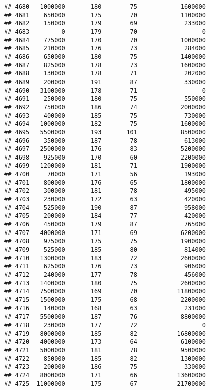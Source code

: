\documentclass[
]{article}
\begin{document}
\begin{verbatim}
## 4680   1000000       180        75            1600000
## 4681    650000       175        70            1100000
## 4682    150000       179        69             233000
## 4683         0       179        70                  0
## 4684    775000       170        70            1000000
## 4685    210000       176        73             284000
## 4686    650000       180        75            1400000
## 4687    825000       178        73            1600000
## 4688    130000       178        71             202000
## 4689    200000       191        87             330000
## 4690   3100000       178        71                  0
## 4691    250000       180        75             550000
## 4692    750000       186        74            2000000
## 4693    400000       185        75             730000
## 4694   1000000       182        75            1600000
## 4695   5500000       193       101            8500000
## 4696    350000       187        78             613000
## 4697   2500000       176        83            5200000
## 4698    925000       170        60            2200000
## 4699   1200000       181        71            1900000
## 4700     70000       171        56             193000
## 4701    800000       176        65            1800000
## 4702    300000       181        78             495000
## 4703    230000       172        63             420000
## 4704    525000       190        87             958000
## 4705    200000       184        77             420000
## 4706    450000       179        87             765000
## 4707   4000000       171        69            6200000
## 4708    975000       175        75            1900000
## 4709    525000       185        80             814000
## 4710   1300000       183        72            2600000
## 4711    625000       176        73             906000
## 4712    240000       177        78             456000
## 4713   1400000       180        75            2600000
## 4714   7500000       169        70           11800000
## 4715   1500000       175        68            2200000
## 4716    140000       168        63             231000
## 4717   5500000       187        76            8800000
## 4718    230000       177        72                  0
## 4719   8000000       185        82           16800000
## 4720   4000000       173        64            6100000
## 4721   5000000       181        78            9500000
## 4722    850000       185        82            1300000
## 4723    200000       186        75             330000
## 4724   8000000       171        66           13600000
## 4725  11000000       175        67           21700000

\end{verbatim}
\end{document}
